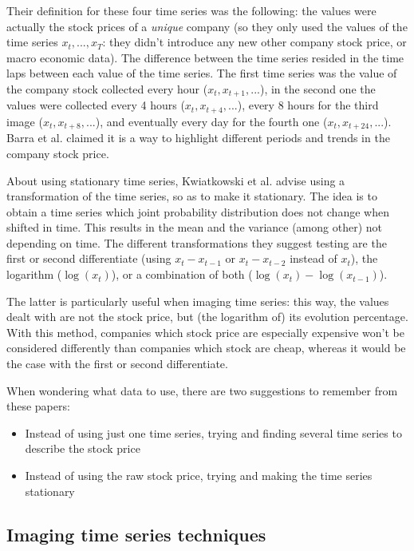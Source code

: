 \documentclass[11pt]{article}
\begin{document}
\begin{onehalfspace}
Their definition for these four time series was the following: the values were actually the stock prices of a \emph{unique} company (so they only used the values of the time series $x_t,...,x_T$: they didn't introduce any new other company stock price, or macro economic data). The difference between the time series resided in the time laps between each value of the time series. The first time series was the value of the company stock collected every hour ($x_t, x_{t+1}, ...$), in the second one the values were collected every 4 hours ($x_t, x_{t + 4},...$), every 8 hours for the third image ($x_t, x_{t + 8}, ...$), and eventually every day for the fourth one ($x_t, x_{t + 24}, ...$). Barra et al. claimed it is a way to highlight different periods and trends in the company stock price. 

About using stationary time series, Kwiatkowski et al. \cite{stationary} advise using a transformation of the time series, so as to make it stationary. The idea is to obtain a time series which joint probability distribution does not change when shifted in time. This results in the mean and the variance (among other) not depending on time. The different transformations they suggest testing are the first or second differentiate (using $x_t - x_{t-1}$ or $x_t - x_{t-2}$ instead of $x_t$), the logarithm ($\log(x_t)$), or a combination of both ($\log(x_t) - \log(x_{t-1})$). 

The latter is particularly useful when imaging time series: this way, the values dealt with are not the stock price, but (the logarithm of) its evolution percentage. With this method, companies which stock price are especially expensive won't be considered differently than companies which stock are cheap, whereas it would be the case with the first or second differentiate.

When wondering what data to use, there are two suggestions to remember from these papers:

\begin{itemize}
    \item Instead of using just one time series, trying and finding several time series to describe the stock price
    \item Instead of using the raw stock price, trying and making the time series stationary
\end{itemize}

\subsection{Imaging time series techniques}
\label{sec:LR_image}


\end{onehalfspace}
\end{document}
